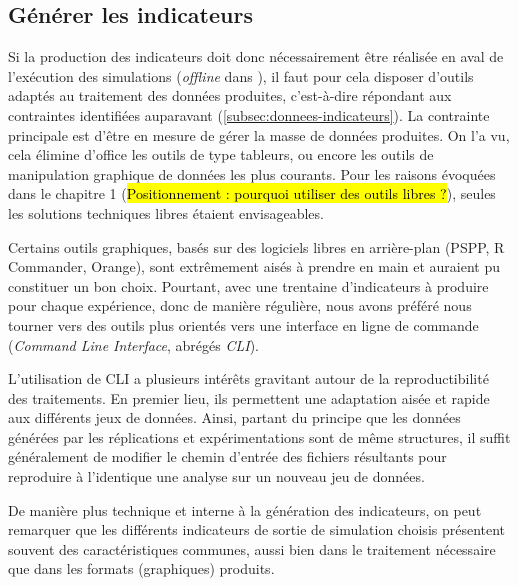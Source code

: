 	\subsection{Générer les indicateurs}

	Si la production des indicateurs doit donc nécessairement être réalisée en aval de l'exécution des simulations (\og \textit{offline}\fg{} dans \cite{grignard_agent-based_2017}), il faut pour cela disposer d'outils adaptés au traitement des données produites, c'est-à-dire répondant aux contraintes identifiées auparavant (\autoref{subsec:donnees-indicateurs}).
	La contrainte principale est d'être en mesure de gérer la masse de données produites.
	On l'a vu, cela élimine d'office les outils de type tableurs, ou encore les outils de manipulation graphique de données les plus courants.
	Pour les raisons évoquées dans le chapitre 1 (\hl{Positionnement : pourquoi utiliser des outils libres ?}), seules les solutions techniques libres étaient envisageables.

	Certains outils graphiques, basés sur des logiciels libres en arrière-plan (PSPP, R Commander, Orange), sont extrêmement aisés à prendre en main et auraient pu constituer un bon choix.
	Pourtant, avec une trentaine d'indicateurs à produire pour chaque expérience, donc de manière régulière, nous avons préféré nous tourner vers des outils plus orientés vers une interface en ligne de commande (\textit{Command Line Interface}, abrégés \textit{CLI}).

	L'utilisation de CLI a plusieurs intérêts gravitant autour de la reproductibilité des traitements.
	En premier lieu, ils permettent une adaptation aisée et rapide aux différents jeux de données.
	Ainsi, partant du principe que les données générées par les réplications et expérimentations sont de même structures, il suffit généralement de modifier le chemin d'entrée des fichiers résultants pour reproduire à l'identique une analyse sur un nouveau jeu de données.

	De manière plus technique et interne à la génération des indicateurs, on peut remarquer que les différents indicateurs de sortie de simulation choisis présentent souvent des caractéristiques communes, aussi bien dans le traitement nécessaire que dans les formats (graphiques) produits.

